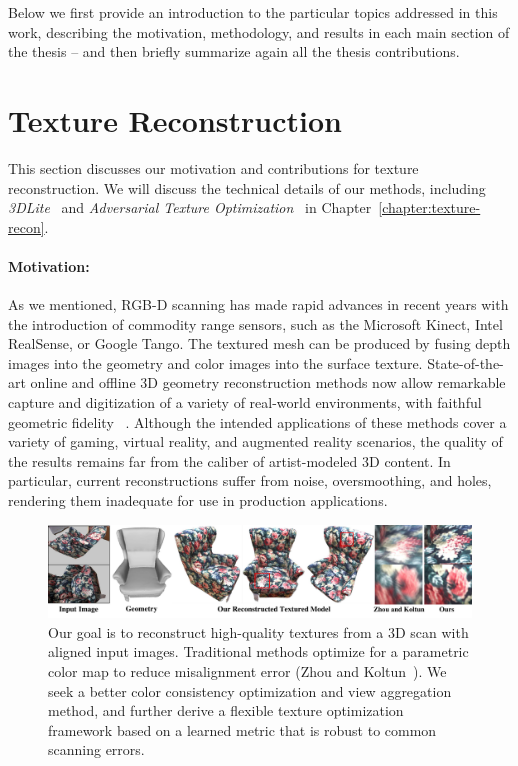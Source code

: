 Below we first provide an introduction to the particular topics addressed in this work, describing the motivation, methodology, and results in each main section of the thesis -- and then briefly summarize again all the thesis contributions.

\section{Texture Reconstruction}
\label{intro:texture-recon}
This section discusses our motivation and contributions for texture reconstruction. We will discuss the technical details of our methods, including \textit{3DLite}~\cite{huang20173dlite} and \textit{Adversarial Texture Optimization}~\cite{huang2020adversarial} in Chapter~\ref{chapter:texture-recon}.

\paragraph*{Motivation:} As we mentioned, RGB-D scanning has made rapid advances in recent years with the introduction of commodity range sensors, such as the Microsoft Kinect, Intel RealSense, or Google Tango. The textured mesh can be produced by fusing depth images into the geometry and color images into the surface texture.
State-of-the-art online and offline 3D geometry reconstruction methods now allow remarkable capture and digitization of a variety of real-world environments, with faithful geometric fidelity~ \cite{newcombe2011kinectfusion,izadi2011kinectfusion,chen2013scalable,niessner2013real,choi2015robust,dai2016bundlefusion}.
Although the intended applications of these methods cover a variety of gaming, virtual reality, and augmented reality scenarios, the quality of the results remains far from the caliber of artist-modeled 3D content.
In particular, current reconstructions suffer from noise, oversmoothing, and holes, rendering them inadequate for use in production applications.

\begin{figure}
    \centering
    \includegraphics[width=\textwidth]{texturegen/figures/teaser-n.pdf}
    \caption{Our goal is to reconstruct high-quality textures from a 3D scan with aligned input images. Traditional methods optimize for a parametric color map to reduce misalignment error (Zhou and Koltun~\cite{zhou2014color}). We seek a better color consistency optimization and view aggregation method, and further derive a flexible texture optimization framework based on a learned metric that is robust to common scanning errors.}
    \label{fig:toptim-teaser}
\end{figure}


